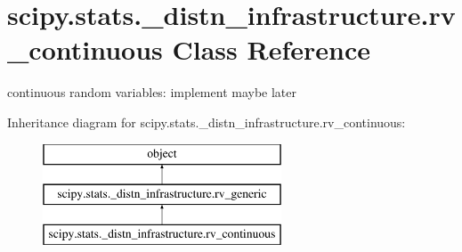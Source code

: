 \hypertarget{classscipy_1_1stats_1_1__distn__infrastructure_1_1rv__continuous}{}\section{scipy.\+stats.\+\_\+distn\+\_\+infrastructure.\+rv\+\_\+continuous Class Reference}
\label{classscipy_1_1stats_1_1__distn__infrastructure_1_1rv__continuous}


continuous random variables\+: implement maybe later  


Inheritance diagram for scipy.\+stats.\+\_\+distn\+\_\+infrastructure.\+rv\+\_\+continuous\+:\begin{figure}[H]
\begin{center}
\leavevmode
\includegraphics[height=3.000000cm]{classscipy_1_1stats_1_1__distn__infrastructure_1_1rv__continuous}
\end{center}
\end{figure}
